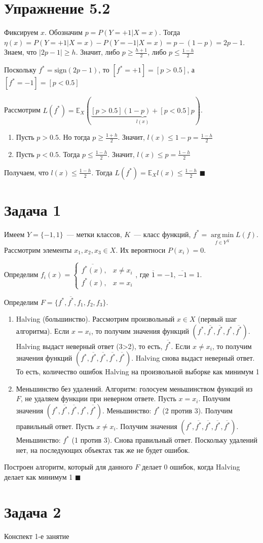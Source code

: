 \documentclass[a4paper]{article}
\DeclareMathOperator*{\argmin}{arg\,min}
\begin{document}
\section*{Упражнение 5.2}
Фиксируем $x$. Обозначим $p=P(Y=+1|X=x)$. Тогда $\eta(x)=P(Y=+1|X=x)-P(Y=-1|X=x)=p-(1-p)=2p-1$. Знаем, что $|2p-1|\geqslant h$. Значит, либо $p\geqslant\frac{h+1}{2}$, либо $p\leqslant \frac{1-h}{2}$

Поскольку $f^*=\mbox{sign}(2p-1)$, то $[f^*=+1]=[p>0.5]$, а $[f^*=-1]=[p<0.5]$

Рассмотрим $L(f^*)=\mathbb{E}_X\left(\underbrace{[p>0.5](1-p)+[p<0.5]p}_{l(x)}\right)$.

\begin{enumerate}
\item Пусть $p>0.5$. Но тогда $p\geqslant \frac{1+h}{2}$. Значит, $l(x)\leqslant 1-p=\frac{1-h}{2}$
\item Пусть $p<0.5$. Тогда $p\leqslant \frac{1-h}{2}$. Значит, $l(x)\leqslant p=\frac{1-h}{2}$
\end{enumerate}

Получаем, что $l(x)\leqslant \frac{1-h}{2}$. Тогда $L(f^*)=\mathbb{E}_Xl(x)\leqslant \frac{1-h}{2}$ $\blacksquare$
\section*{Задача 1}
Имеем $Y=\{-1,1\}$~--- метки классов, $K$~--- класс функций, $f^*=\argmin\limits_{f\in Y^X} L(f)$. Рассмотрим элементы $x_1,x_2,x_3\in X$. Их вероятноси $P(x_i)=0$.

Определим $f_i(x)=\begin{cases}
\overline{f^*(x)},&x\neq x_i\\
f^*(x),&x=x_i
\end{cases}$, где $\overline{1}=-1$, $\overline{-1}=1$.

Определим $F=\{f^*, \overline{f^*}, f_1, f_2, f_3\}$.

\begin{enumerate}
\item Halving (большинство). Рассмотрим произвольный $x\in X$ (первый шаг алгоритма). Если $x=x_i$, то получим значения функций $(f^*, \overline{f^*}, \overline{f^*},f^*,\overline{f^*})$. Halving выдаст неверный ответ (3>2), то есть, $\overline{f^*}$. Если $x\neq x_i$, то получим значения функций $(f^*, \overline{f^*}, \overline{f^*},\overline{f^*},\overline{f^*})$. Halving снова выдаст неверный ответ. То есть, количество ошибок Halving на произвольной выборке как минимум 1
\item Меньшинство без удалений. Алгоритм: голосуем меньшинством функций из $F$, не удаляем функции при неверном ответе. Пусть $x=x_i$. Получим значения $(f^*, \overline{f^*}, \overline{f^*},f^*,\overline{f^*})$. Меньшинство: $f^*$ (2 против 3). Получим правильный ответ. Пусть $x\neq x_i$. Получим значения $(f^*, \overline{f^*}, \overline{f^*},\overline{f^*},\overline{f^*})$. Меньшинство: $f^*$ (1 против 3). Снова правильный ответ. Поскольку удалений нет, на последующих объектах так же не будет ошибок.
\end{enumerate}
Построен алгоритм, который для данного $F$ делает 0 ошибок, когда Halving делает как минимум 1 $\blacksquare$
\section*{Задача 2}
Конспект 1-е занятие
\end{document}
